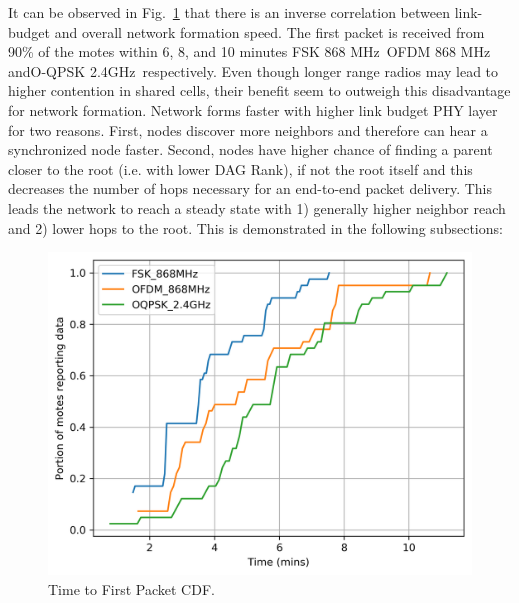 \documentclass[journal]{IEEEtran}
\newcommand{\fsk}          {FSK 868 MHz}
\newcommand{\oqpsk}        {O-QPSK 2.4GHz}
\newcommand{\ofdm}         {OFDM 868 MHz}
\begin{document}
It can be observed in Fig.~\ref{fig:time_firstpacket_cdf} that there is an inverse correlation between link-budget and overall network formation speed. 
The first packet is received from  90\% of the motes within 6, 8, and 10 minutes \fsk\, \ofdm\, and\oqpsk\ respectively. 
Even though longer range radios may lead to higher contention in shared cells, their benefit seem to outweigh this disadvantage for network formation.
Network forms faster with higher link budget PHY layer for two reasons. First, nodes discover more neighbors and therefore can hear a synchronized node faster. Second, nodes have higher chance of finding a parent closer to the root (i.e. with lower DAG Rank), if not the root itself and this decreases the number of hops necessary for an end-to-end packet delivery.
This leads the network to reach a steady state with 1) generally higher neighbor reach and 2) lower hops to the root. 
This is demonstrated in the following subsections: 


\begin{figure}
	\centering
	\includegraphics[width=0.90\columnwidth]{time_firstpacket_cdf}
	\caption{Time to First Packet CDF.}
    \label{fig:time_firstpacket_cdf}
\end{figure}

\end{document}
